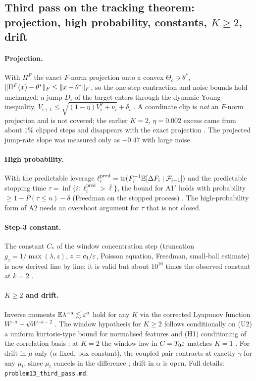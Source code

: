 \subsection{Third pass on the tracking theorem: projection, high probability, constants, $K\ge2$, drift}
\paragraph{Projection.} With $\Pi^{F}$ the exact $F$-norm projection onto a convex $\Theta_c\ni\theta^*$, $\lVert \Pi^F(x)-\theta^*\rVert_F\le\lVert x-\theta^*\rVert_F$, so the one-step contraction and noise bounds hold unchanged; a jump $D_i$ of the target enters through the dynamic Young inequality, $V_{i+1}\le\sqrt{(1-\eta)V_i^2+\nu_i}+\delta_i$ \Ps{}. A coordinate clip is \emph{not} an $F$-norm projection and is not covered; the earlier $K=2$, $\eta=0.002$ excess came from about $1\%$ clipped steps and disappears with the exact projection \Nt{}. The projected jump-rate slope was measured only as $-0.47$ with large noise.
\paragraph{High probability.} With the predictable leverage $\ell_i^{\mathrm{pred}}=\mathrm{tr}(F_i^{-1}\mathbb{E}[\Delta F_i\mid\mathcal F_{i-1}])$ and the predictable stopping time $\tau=\inf\{i:\ell_i^{\mathrm{pred}}>\bar\ell\}$, the bound for A1$'$ holds with probability $\ge1-P(\tau\le n)-\delta$ (Freedman on the stopped process) \Ps{}. The high-probability form of A2 needs an overshoot argument for $\tau$ that is not closed.
\paragraph{Step-3 constant.} The constant $C_*$ of the window concentration step (truncation $g_z=1/\max(\lambda,z)$, $z=c_1/\varepsilon$, Poisson equation, Freedman, small-ball estimate) is now derived line by line; it is valid but about $10^{10}$ times the observed constant at $k=2$ \Nt{}.
\paragraph{$K\ge2$ and drift.} Inverse moments $\mathbb{E}\lambda^{-a}\lesssim\varepsilon^a$ hold for any $K$ via the corrected Lyapunov function $W^{-a}+\psi W^{-a-2}$ \Pt{}. The window hypothesis for $K\ge2$ follows conditionally on (U2) a uniform kurtosis-type bound for normalised features and (H1) conditioning of the correlation basis \Ps{}; at $K=2$ the window law in $C=T_0\varepsilon$ matches $K=1$ \Nt{}. For drift in $\mu$ only ($\alpha$ fixed, box constant), the coupled pair contracts at exactly $\gamma$ for any $\mu_t$, since $\mu_t$ cancels in the difference \Pt{}; drift in $\alpha$ is open. Full details: \texttt{problem13\_third\_pass.md}.


